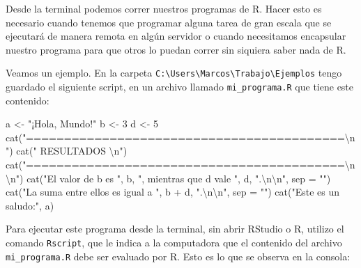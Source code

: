 \documentclass[
]{book}
\newenvironment{Shaded}{\begin{snugshade}}{\end{snugshade}}
\newcommand{\AttributeTok}[1]{\textcolor[rgb]{0.77,0.63,0.00}{#1}}
\newcommand{\DecValTok}[1]{\textcolor[rgb]{0.00,0.00,0.81}{#1}}
\newcommand{\FunctionTok}[1]{\textcolor[rgb]{0.00,0.00,0.00}{#1}}
\newcommand{\NormalTok}[1]{#1}
\newcommand{\OtherTok}[1]{\textcolor[rgb]{0.56,0.35,0.01}{#1}}
\newcommand{\SpecialCharTok}[1]{\textcolor[rgb]{0.00,0.00,0.00}{#1}}
\newcommand{\StringTok}[1]{\textcolor[rgb]{0.31,0.60,0.02}{#1}}
\begin{document}
Desde la terminal podemos correr nuestros programas de R. Hacer esto es necesario cuando tenemos que programar alguna tarea de gran escala que se ejecutará de manera remota en algún servidor o cuando necesitamos encapsular nuestro programa para que otros lo puedan correr sin siquiera saber nada de R.

Veamos un ejemplo. En la carpeta \texttt{C:\textbackslash{}Users\textbackslash{}Marcos\textbackslash{}Trabajo\textbackslash{}Ejemplos} tengo guardado el siguiente script, en un archivo llamado \texttt{mi\_programa.R} que tiene este contenido:

\begin{Shaded}
\begin{Highlighting}[]
\NormalTok{a }\OtherTok{\textless{}{-}} \StringTok{"¡Hola, Mundo!"}
\NormalTok{b }\OtherTok{\textless{}{-}} \DecValTok{3}
\NormalTok{d }\OtherTok{\textless{}{-}} \DecValTok{5}
\FunctionTok{cat}\NormalTok{(}\StringTok{"==========================================}\SpecialCharTok{\textbackslash{}n}\StringTok{"}\NormalTok{)}
\FunctionTok{cat}\NormalTok{(}\StringTok{"                 RESULTADOS               }\SpecialCharTok{\textbackslash{}n}\StringTok{"}\NormalTok{)}
\FunctionTok{cat}\NormalTok{(}\StringTok{"==========================================}\SpecialCharTok{\textbackslash{}n\textbackslash{}n}\StringTok{"}\NormalTok{)}
\FunctionTok{cat}\NormalTok{(}\StringTok{"El valor de b es "}\NormalTok{, b, }\StringTok{", mientras que d vale "}\NormalTok{, d, }\StringTok{".}\SpecialCharTok{\textbackslash{}n\textbackslash{}n}\StringTok{"}\NormalTok{, }\AttributeTok{sep =} \StringTok{""}\NormalTok{)}
\FunctionTok{cat}\NormalTok{(}\StringTok{"La suma entre ellos es igual a "}\NormalTok{, b }\SpecialCharTok{+}\NormalTok{ d, }\StringTok{".}\SpecialCharTok{\textbackslash{}n\textbackslash{}n}\StringTok{"}\NormalTok{, }\AttributeTok{sep =} \StringTok{""}\NormalTok{)}
\FunctionTok{cat}\NormalTok{(}\StringTok{"Este es un saludo:"}\NormalTok{, a)}
\end{Highlighting}
\end{Shaded}

Para ejecutar este programa desde la terminal, sin abrir RStudio o R, utilizo el comando \texttt{Rscript}, que le indica a la computadora que el contenido del archivo \texttt{mi\_programa.R} debe ser evaluado por R. Esto es lo que se observa en la consola:
\end{document}
